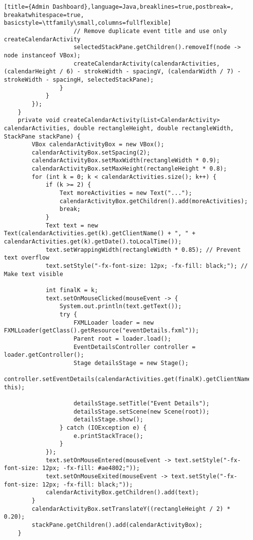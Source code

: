 \begin{lstlisting}[title={Admin Dashboard},language=Java,breaklines=true,postbreak=, breakatwhitespace=true, basicstyle=\ttfamily\small,columns=fullflexible]
                    // Remove duplicate event title and use only createCalendarActivity
                    selectedStackPane.getChildren().removeIf(node -> node instanceof VBox);
                    createCalendarActivity(calendarActivities, (calendarHeight / 6) - strokeWidth - spacingV, (calendarWidth / 7) - strokeWidth - spacingH, selectedStackPane);
                }
            }
        });
    }
    private void createCalendarActivity(List<CalendarActivity> calendarActivities, double rectangleHeight, double rectangleWidth, StackPane stackPane) {
        VBox calendarActivityBox = new VBox();
        calendarActivityBox.setSpacing(2);
        calendarActivityBox.setMaxWidth(rectangleWidth * 0.9);
        calendarActivityBox.setMaxHeight(rectangleHeight * 0.8);
        for (int k = 0; k < calendarActivities.size(); k++) {
            if (k >= 2) {
                Text moreActivities = new Text("...");
                calendarActivityBox.getChildren().add(moreActivities);
                break;
            }
            Text text = new Text(calendarActivities.get(k).getClientName() + ", " + calendarActivities.get(k).getDate().toLocalTime());
            text.setWrappingWidth(rectangleWidth * 0.85); // Prevent text overflow
            text.setStyle("-fx-font-size: 12px; -fx-fill: black;"); // Make text visible

            int finalK = k;
            text.setOnMouseClicked(mouseEvent -> {
                System.out.println(text.getText());
                try {
                    FXMLLoader loader = new FXMLLoader(getClass().getResource("eventDetails.fxml"));
                    Parent root = loader.load();
                    EventDetailsController controller = loader.getController();
                    Stage detailsStage = new Stage();
                    controller.setEventDetails(calendarActivities.get(finalK).getClientName(), this);

                    detailsStage.setTitle("Event Details");
                    detailsStage.setScene(new Scene(root));
                    detailsStage.show();
                } catch (IOException e) {
                    e.printStackTrace();
                }
            });
            text.setOnMouseEntered(mouseEvent -> text.setStyle("-fx-font-size: 12px; -fx-fill: #ae4802;"));
            text.setOnMouseExited(mouseEvent -> text.setStyle("-fx-font-size: 12px; -fx-fill: black;"));
            calendarActivityBox.getChildren().add(text);
        }
        calendarActivityBox.setTranslateY((rectangleHeight / 2) * 0.20);
        stackPane.getChildren().add(calendarActivityBox);
    }


\end{lstlisting}
